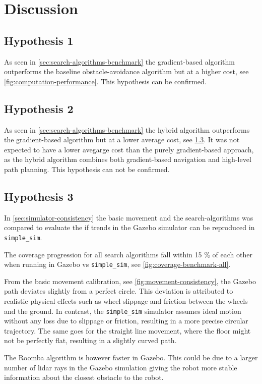 \section{Discussion}
\subsection{Hypothesis 1}
As seen in \cref{sec:search-algorithms-benchmark} the gradient-based algorithm outperforms the baseline obstacle-avoidance algorithm but at a higher cost, see \cref{fig:computation-performance}.
This hypothesis can be confirmed.


\subsection{Hypothesis 2}
As seen in \cref{sec:search-algorithms-benchmark} the hybrid algorithm outperforms the gradient-based algorithm but at a lower average cost, see \cref{}. It was not expected to have a lower avegarge cost than the purely gradient-based approach, as the hybrid algorithm combines both gradient-based navigation and high-level path planning.
This hypothesis can not be confirmed.

\subsection{Hypothesis 3}
In \cref{sec:simulator-consistency} the basic movement and the search-algorithms was compared to evaluate the if trends in the Gazebo simulator can be reproduced in \texttt{simple\_sim}. 

The coverage progression for all search algorithms fall within 15 \% of each other when running in Gazebo vs \texttt{simple\_sim}, see \cref{fig:coverage-benchmark-all}. 

From the basic movement calibration, see \cref{fig:movement-consistency}, the Gazebo path deviates slightly from a perfect circle. This deviation is attributed to realistic physical effects such as wheel slippage and friction between the wheels and the ground. In contrast, the \texttt{simple\_sim} simulator assumes ideal motion without any loss due to slippage or friction, resulting in a more precise circular trajectory. The same goes for the straight line movement, where the floor might not be perfectly flat, resulting in a slightly curved path.

The Roomba algorithm is however faster in Gazebo. This could be due to a larger number of lidar rays in the Gazebo simulation giving the robot more stable information about the closest obstacle to the robot. 

